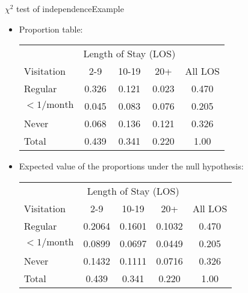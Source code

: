\documentclass[xcolor=dvipsnames]{beamer}
\begin{document}
\begin{frame}{$\chi^2$ test of independence}{Example}
	\begin{itemize}
		\item Proportion table:
		\vspace{1mm}
		{\scriptsize
		\begin{center}
			\begin{tabular}{|l|ccc|c|}
				\hline
				& \multicolumn{3}{c|}{Length of Stay (LOS)} & \\
				Visitation & 2-9 & 10-19 & 20+ & All LOS \\ \hline
				Regular & 0.326 & 0.121 & 0.023 & 0.470\\ 
				$<1/\text{month}$ & 0.045 & 0.083 & 0.076 & 0.205 \\
				Never & 0.068 & 0.136 & 0.121 & 0.326\\ \hline
				Total & 0.439 & 0.341 & 0.220 & 1.00\\ \hline
			\end{tabular}
		\end{center}}  \pause
	\vspace{1mm}
	\item Expected value of the proportions under the null hypothesis:
	\vspace{1mm}
		{\scriptsize
			\begin{center}
				\begin{tabular}{|l|ccc|c|}
					\hline
					& \multicolumn{3}{c|}{Length of Stay (LOS)} & \\
					Visitation & 2-9 & 10-19 & 20+ & All LOS \\ \hline
					Regular           &0.2064 &0.1601 &0.1032 & 0.470\\
					$<1/\text{month}$ &0.0899 &0.0697 &0.0449 & 0.205\\
					Never             &0.1432 &0.1111 &0.0716 & 0.326\\ \hline
					Total & 0.439 & 0.341 & 0.220 & 1.00\\ \hline
				\end{tabular}
		\end{center}}
	\end{itemize}
\end{frame}
\end{document}
